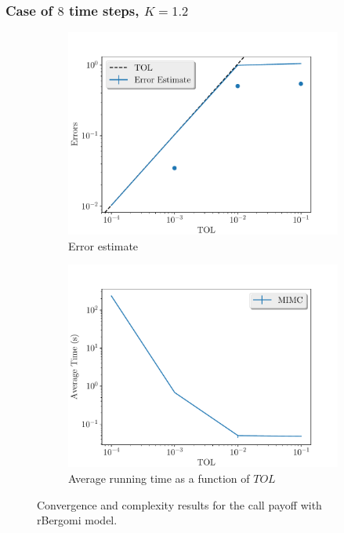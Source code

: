 \documentclass[11pt]{article}
\begin{document}
\newpage
\subsubsection*{Case of $8$ time steps, $K=1.2$}
\begin{figure}[!h]
	\centering
	\begin{subfigure}{.5\textwidth}
		\centering
		\includegraphics[width=1\linewidth]{./figures/rbergomi_8_steps_K_1_2/error_estimate.pdf}
		\caption{Error estimate}
		\label{fig:misc_rbergomi_8_steps_K_1_2_sub1}
	\end{subfigure}%
	\begin{subfigure}{.5\textwidth}
		\centering
		\includegraphics[width=1\linewidth]{./figures/rbergomi_8_steps_K_1_2/average_running_time.pdf}
		\caption{Average running time as a function of $TOL$}
		\label{fig:misc_rbergomi_8_steps_K_1_2_sub2}
	\end{subfigure}%
	\caption{Convergence and complexity results for the call payoff with rBergomi model.}
	\label{fig:misc_rbergomi_8_steps_K_1_2_1}
\end{figure}
\end{document}
